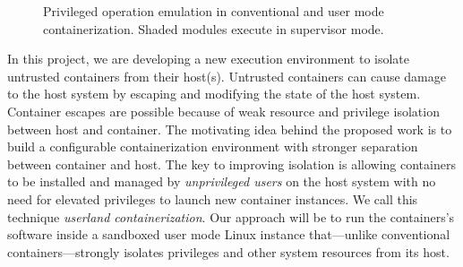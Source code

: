 \documentclass[10pt,onecolumn]{article}
\begin{document}
\begin{figure}[tb]
    \centering
  \caption{Privileged operation emulation in conventional and user mode containerization. Shaded modules execute in supervisor mode.}
  \label{fig:diagram}
\end{figure}


In this project, we are  developing a new execution environment to isolate untrusted containers from their host(s).
Untrusted containers can cause damage to the host system by escaping and modifying the state of the host system.
Container escapes are possible because of weak resource and privilege isolation between host and container.
The motivating idea behind the proposed work is to build a configurable containerization environment with stronger separation between container and host.
The key to improving isolation is allowing containers to be installed and managed by \emph{unprivileged users} on the host system with no need for elevated privileges to launch new container instances.
We call this technique \emph{userland containerization}.
Our approach will be to run the containers's software inside a sandboxed user mode Linux instance that---unlike conventional containers---strongly isolates privileges and other system resources from its host.%
\end{document}
